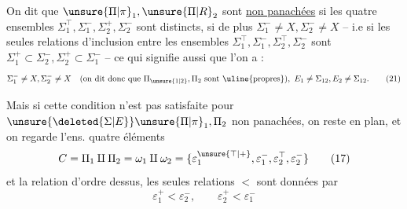 \noindent\begin{minipage}[t]{.04\linewidth}
\vspace{1.2\baselineskip}
\end{minipage}\hfill\begin{minipage}[t]{.94\linewidth}
\vspace{0pt}
\uline{} On dit que $\unsure{\Pi|\pi}_1,\unsure{\Pi|R}_2$ sont \uline{ non panachées}  si les quatre ensembles $\Sigma_1^\top,\Sigma_1^-,\Sigma_2^+,\Sigma_2^-$ sont distincts,  si  de plus $\Sigma_1^-\ne X,\Sigma_2^-\ne X$ -- i.e si les seules relations d'inclusion entre les ensembles $\Sigma_1^\top,\Sigma_1^-,\Sigma_2^\top,\Sigma_2^-$ sont $\Sigma_1^+\subset\Sigma_2^-,\Sigma_2^+\subset\Sigma_1^-$ -- ce qui signifie aussi que l'on a :
\[
\Sigma_1^-\ne X,\Sigma_2^-\ne X
\quad(\text{on dit donc que }\Pi_{\unsure{1|2}},\Pi_2\text{ sont \uline{propres}}),
\ E_1\ne\Sigma_{12},E_2\ne\Sigma_{12}.
\tag*{(21)}
\]
\end{minipage}
\endgroup
\clearpage

\begingroup\makeatletter\tagsleft@true\makeatother
Mais si cette condition n'est pas satisfaite pour $\unsure{\deleted{\Sigma|E}}\unsure{\Pi|\pi}_1,\Pi_2$ non panachées, on reste en plan, et on regarde l'ens.  quatre éléments
\[
C=\Pi_1\amalg\Pi_2=\omega_1\amalg\omega_2
=\{\varepsilon_1^{\unsure{\top|+}},\varepsilon_1^-,\varepsilon_2^{\top},\varepsilon_2^-\}
\tag*{(17)}
\]
et la relation d'ordre dessus,  les seules relations $<$ sont données par
\[
\varepsilon_1^+<\varepsilon_2^-,\qquad\varepsilon_2^+<\varepsilon_1^-
\tag*{(22)}
\]

